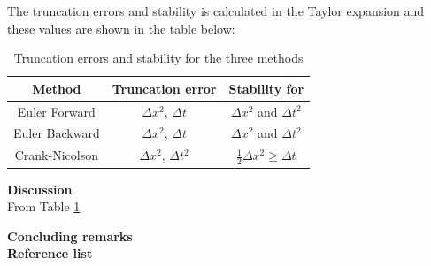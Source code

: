 \documentclass[10pt,a4paper]{article}
\begin{document}
\noindent The truncation errors and stability is calculated in the Taylor expansion and these values are shown in the table below:


\begin{table}[H]
\centering
\begin{tabular}{|c|c|c|}
\hline
Method & Truncation error & Stability for\\
\hline
Euler Forward & $\Delta x^2$, $\Delta t$ & $\Delta x^2$ and $\Delta t^2$\\
\hline
Euler Backward & $\Delta x^2$, $\Delta t$ & $\Delta x^2$ and $\Delta t^2$\\
\hline
Crank-Nicolson & $\Delta x^2$, $\Delta t^2$ & $\frac{1}{2} \Delta x^2 \geq \Delta t$\\
\hline
\end{tabular}
\caption{Truncation errors and stability for the three methods}
\label{truncstab}
\end{table}





\newpage
{\LARGE\bf
Discussion
}\\

From Table \ref{truncstab}





\newpage
{\LARGE\bf
Concluding remarks
}\\





\newpage
{\LARGE\bf
Reference list
}\\
\end{document}
